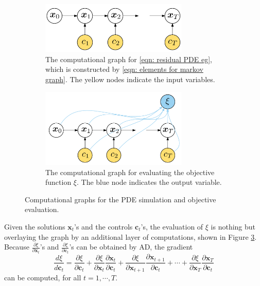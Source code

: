 \begin{figure}[htbp]\begin{center}
    \begin{subfigure}[t]{.99\textwidth}
        \centering
        \includegraphics[width=7cm]{../markovChain.png}
        \caption{The computational graph for \eqref{eqn: residual PDE eg}, which is constructed
                 by \eqref{eqn: elements for markov graph}. The yellow
                 nodes indicate the input variables.}
        \label{fig: chap1 graph 1}
    \end{subfigure}
    \begin{subfigure}[t]{.99\textwidth}
        \centering
        \includegraphics[width=7cm]{../markovChain2.png}
        \caption{The computational graph for evaluating the objective function $\xi$.
                 The blue node indicates the output variable.}
        \label{fig: chap1 graph 2}
    \end{subfigure}
    \caption{Computational graphs for the PDE simulation and objective evaluation.}
\end{center}\end{figure}
Given the solutions $\boldsymbol{x}_t$'s and the controls $\boldsymbol{c}_t$'s, 
the evaluation of $\xi$ is nothing but overlaying the graph by an additional 
layer of computations, shown in Figure \ref{fig: chap1 graph 2}.
Because $\frac{\partial \xi}{\partial \boldsymbol{x}_t}$'s and 
$\frac{\partial \xi}{\partial \boldsymbol{c}_t}$'s can be obtained by AD, the gradient
\begin{equation} 
    \frac{d\xi}{d \boldsymbol{c}_t}= \frac{\partial \xi}{\partial \boldsymbol{c}_t} + 
    \frac{\partial \xi}{\partial \boldsymbol{x}_t}\frac{\partial \boldsymbol{x}_t}{\partial 
       \boldsymbol{c}_t} +
    \frac{\partial \xi}{\partial \boldsymbol{x}_{t+1}} \frac{\partial \boldsymbol{x}_{t+1}}{\partial
       \boldsymbol{c}_t} + \cdots +
    \frac{\partial \xi}{\partial \boldsymbol{x}_{T}} \frac{\partial \boldsymbol{x}_{T}}{\partial
       \boldsymbol{c}_t}
\end{equation}
can be computed, for all $t=1, \cdots , T$.\\

